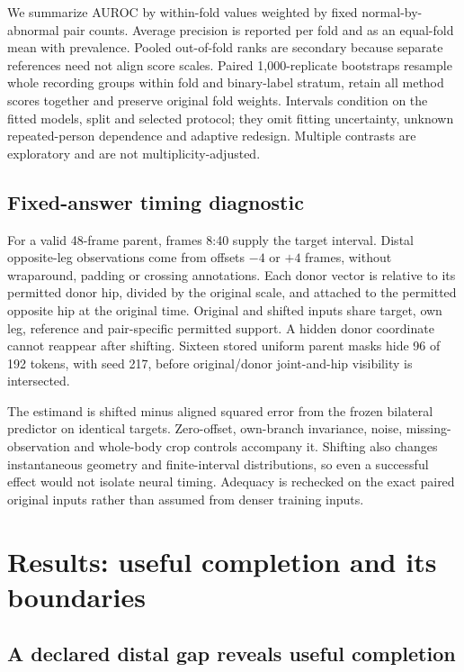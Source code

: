 \documentclass[letterpaper]{article}
\begin{document}
We summarize AUROC by within-fold values weighted by fixed normal-by-abnormal pair counts. Average precision is reported per fold and as an equal-fold mean with prevalence. Pooled out-of-fold ranks are secondary because separate references need not align score scales. Paired 1,000-replicate bootstraps resample whole recording groups within fold and binary-label stratum, retain all method scores together and preserve original fold weights. Intervals condition on the fitted models, split and selected protocol; they omit fitting uncertainty, unknown repeated-person dependence and adaptive redesign. Multiple contrasts are exploratory and are not multiplicity-adjusted.

\subsection{Fixed-answer timing diagnostic}

For a valid 48-frame parent, frames 8:40 supply the target interval. Distal opposite-leg observations come from offsets \(-4\) or \(+4\) frames, without wraparound, padding or crossing annotations. Each donor vector is relative to its permitted donor hip, divided by the original scale, and attached to the permitted opposite hip at the original time. Original and shifted inputs share target, own leg, reference and pair-specific permitted support. A hidden donor coordinate cannot reappear after shifting. Sixteen stored uniform parent masks hide 96 of 192 tokens, with seed 217, before original/donor joint-and-hip visibility is intersected.

The estimand is shifted minus aligned squared error from the frozen bilateral predictor on identical targets. Zero-offset, own-branch invariance, noise, missing-observation and whole-body crop controls accompany it. Shifting also changes instantaneous geometry and finite-interval distributions, so even a successful effect would not isolate neural timing. Adequacy is rechecked on the exact paired original inputs rather than assumed from denser training inputs.

\section{Results: useful completion and its boundaries}

\subsection{A declared distal gap reveals useful completion}
\end{document}
